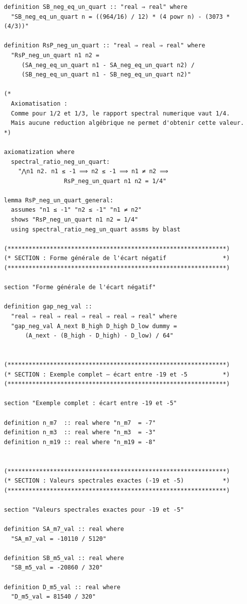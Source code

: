 \documentclass[a4paper,11pt]{article}
\begin{document}
\begin{holcode}[title={\textcolor{white}{Fichier : methode\_spectral.thy -- Partie 1/4}}]
\begin{lstlisting}
definition SB_neg_eq_un_quart :: "real ⇒ real" where
  "SB_neg_eq_un_quart n = ((964/16) / 12) * (4 powr n) - (3073 * (4/3))"

definition RsP_neg_un_quart :: "real ⇒ real ⇒ real" where
  "RsP_neg_un_quart n1 n2 =
     (SA_neg_eq_un_quart n1 - SA_neg_eq_un_quart n2) /
     (SB_neg_eq_un_quart n1 - SB_neg_eq_un_quart n2)"

(*
  Axiomatisation :
  Comme pour 1/2 et 1/3, le rapport spectral numerique vaut 1/4.
  Mais aucune reduction algébrique ne permet d'obtenir cette valeur.
*)

axiomatization where
  spectral_ratio_neg_un_quart:
    "⋀n1 n2. n1 ≤ -1 ⟹ n2 ≤ -1 ⟹ n1 ≠ n2 ⟹
                 RsP_neg_un_quart n1 n2 = 1/4"

lemma RsP_neg_un_quart_general:
  assumes "n1 ≤ -1" "n2 ≤ -1" "n1 ≠ n2"
  shows "RsP_neg_un_quart n1 n2 = 1/4"
  using spectral_ratio_neg_un_quart assms by blast

(**************************************************************)
(* SECTION : Forme générale de l'écart négatif                *)
(**************************************************************)

section "Forme générale de l'écart négatif"

definition gap_neg_val ::
  "real ⇒ real ⇒ real ⇒ real ⇒ real ⇒ real" where
  "gap_neg_val A_next B_high D_high D_low dummy =
      (A_next - (B_high - D_high) - D_low) / 64"


(**************************************************************)
(* SECTION : Exemple complet – écart entre -19 et -5          *)
(**************************************************************)

section "Exemple complet : écart entre -19 et -5"

definition n_m7  :: real where "n_m7  = -7"
definition n_m3  :: real where "n_m3  = -3"
definition n_m19 :: real where "n_m19 = -8"


(**************************************************************)
(* SECTION : Valeurs spectrales exactes (-19 et -5)           *)
(**************************************************************)

section "Valeurs spectrales exactes pour -19 et -5"

definition SA_m7_val :: real where
  "SA_m7_val = -10110 / 5120"

definition SB_m5_val :: real where
  "SB_m5_val = -20860 / 320"

definition D_m5_val :: real where
  "D_m5_val = 81540 / 320"


\end{lstlisting}
\end{holcode}
\end{document}
